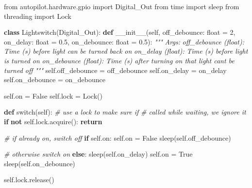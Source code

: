 \documentclass[10pt]{tufte-book}
\newenvironment{Shaded}{}{}
\newcommand{\BuiltInTok}[1]{#1}
\newcommand{\CommentTok}[1]{\textcolor[rgb]{0.38,0.63,0.69}{\textit{#1}}}
\newcommand{\ControlFlowTok}[1]{\textcolor[rgb]{0.00,0.44,0.13}{\textbf{#1}}}
\newcommand{\DecValTok}[1]{\textcolor[rgb]{0.25,0.63,0.44}{#1}}
\newcommand{\FloatTok}[1]{\textcolor[rgb]{0.25,0.63,0.44}{#1}}
\newcommand{\FunctionTok}[1]{\textcolor[rgb]{0.02,0.16,0.49}{#1}}
\newcommand{\ImportTok}[1]{#1}
\newcommand{\KeywordTok}[1]{\textcolor[rgb]{0.00,0.44,0.13}{\textbf{#1}}}
\newcommand{\NormalTok}[1]{#1}
\newcommand{\OperatorTok}[1]{\textcolor[rgb]{0.40,0.40,0.40}{#1}}
\newcommand{\VariableTok}[1]{\textcolor[rgb]{0.10,0.09,0.49}{#1}}
\begin{document}
\begin{Shaded}
\begin{Highlighting}[]
\ImportTok{from}\NormalTok{ autopilot.hardware.gpio }\ImportTok{import}\NormalTok{ Digital\_Out}
\ImportTok{from}\NormalTok{ time }\ImportTok{import}\NormalTok{ sleep}
\ImportTok{from}\NormalTok{ threading }\ImportTok{import}\NormalTok{ Lock}

\KeywordTok{class}\NormalTok{ Lightswitch(Digital\_Out):}
  \KeywordTok{def} \FunctionTok{\_\_init\_\_}\NormalTok{(}\VariableTok{self}\NormalTok{,}
\NormalTok{    off\_debounce: }\BuiltInTok{float} \OperatorTok{=} \DecValTok{2}\NormalTok{,}
\NormalTok{    on\_delay:     }\BuiltInTok{float} \OperatorTok{=} \FloatTok{0.5}\NormalTok{,}
\NormalTok{    on\_debounce:  }\BuiltInTok{float} \OperatorTok{=} \FloatTok{0.5}\NormalTok{):}
    \CommentTok{"""}
\CommentTok{    Args:}
\CommentTok{      off\_debounce (float): }
\CommentTok{        Time (s) before light can be turned back on}
\CommentTok{      on\_delay (float): }
\CommentTok{        Time (s) before light is turned on}
\CommentTok{      on\_debounce (float): }
\CommentTok{        Time (s) after turning on that light can\textquotesingle{}t be turned off}
\CommentTok{    """}
    \VariableTok{self}\NormalTok{.off\_debounce }\OperatorTok{=}\NormalTok{ off\_debounce}
    \VariableTok{self}\NormalTok{.on\_delay     }\OperatorTok{=}\NormalTok{ on\_delay}
    \VariableTok{self}\NormalTok{.on\_debounce  }\OperatorTok{=}\NormalTok{ on\_debounce}

    \VariableTok{self}\NormalTok{.on }\OperatorTok{=} \VariableTok{False}
    \VariableTok{self}\NormalTok{.lock }\OperatorTok{=}\NormalTok{ Lock()}

  \KeywordTok{def}\NormalTok{ switch(}\VariableTok{self}\NormalTok{):}
    \CommentTok{\# use a lock to make sure if}
    \CommentTok{\# called while waiting, we ignore it}
    \ControlFlowTok{if} \KeywordTok{not} \VariableTok{self}\NormalTok{.lock.acquire():}
      \ControlFlowTok{return}

    \CommentTok{\# if already on, switch off}
    \ControlFlowTok{if} \VariableTok{self}\NormalTok{.on: }
      \VariableTok{self}\NormalTok{.on }\OperatorTok{=} \VariableTok{False}
\NormalTok{      sleep(}\VariableTok{self}\NormalTok{.off\_debounce)}

    \CommentTok{\# otherwise switch on}
    \ControlFlowTok{else}\NormalTok{: }
\NormalTok{      sleep(}\VariableTok{self}\NormalTok{.on\_delay)}
      \VariableTok{self}\NormalTok{.on }\OperatorTok{=} \VariableTok{True}
\NormalTok{      sleep(}\VariableTok{self}\NormalTok{.on\_debounce)}

    \VariableTok{self}\NormalTok{.lock.release()}
\end{Highlighting}
\end{Shaded}
\end{document}
